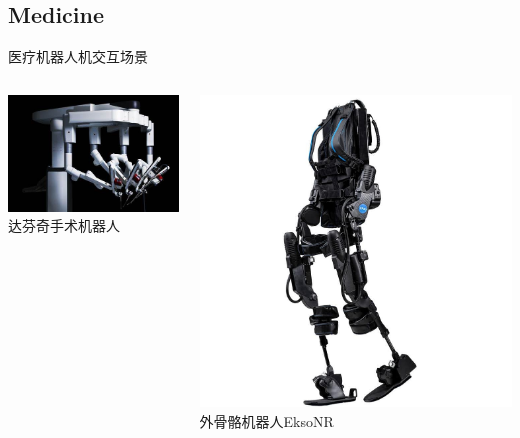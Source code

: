 \documentclass{beamer}
\begin{document}
\subsection{Medicine}
\begin{frame}{医疗机器人机交互场景}
\begin{columns}[c] %

\begin{column}{0.35\textwidth}
\centering
\includegraphics[width=\textwidth]{medicine/1.jpg}
\smallskip
\footnotesize{达芬奇手术机器人}
\end{column}

\begin{column}{0.3\textwidth}
\centering
\vspace{5mm}
\includegraphics[width=\textwidth]{medicine/3.jpg}
\smallskip
\footnotesize{外骨骼机器人EksoNR}
\end{column}


\end{columns}
\end{frame}
\end{document}
